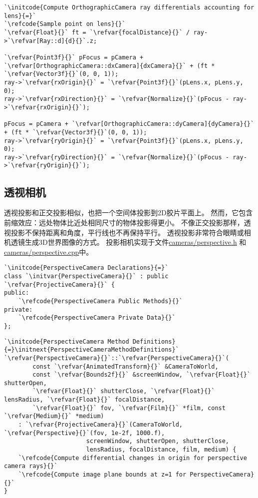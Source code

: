 \begin{lstlisting}
`\initcode{Compute OrthographicCamera ray differentials accounting for lens}{=}`
`\refcode{Sample point on lens}{}`
`\refvar{Float}{}` ft = `\refvar{focalDistance}{}` / ray->`\refvar[Ray::d]{d}{}`.z;

`\refvar{Point3f}{}` pFocus = pCamera + `\refvar[OrthographicCamera::dxCamera]{dxCamera}{}` + (ft * `\refvar{Vector3f}{}`(0, 0, 1));
ray->`\refvar{rxOrigin}{}` = `\refvar{Point3f}{}`(pLens.x, pLens.y, 0);
ray->`\refvar{rxDirection}{}` = `\refvar{Normalize}{}`(pFocus - ray->`\refvar{rxOrigin}{}`);

pFocus = pCamera + `\refvar[OrthographicCamera::dyCamera]{dyCamera}{}` + (ft * `\refvar{Vector3f}{}`(0, 0, 1));
ray->`\refvar{ryOrigin}{}` = `\refvar{Point3f}{}`(pLens.x, pLens.y, 0);
ray->`\refvar{ryDirection}{}` = `\refvar{Normalize}{}`(pFocus - ray->`\refvar{ryOrigin}{}`);
\end{lstlisting}

\subsection{透视相机}\label{sub:透视相机}
透视投影和正交投影相似，也把一个空间体投影到2D胶片平面上。
然而，它包含前缩效应：远处物体比近处相同尺寸的物体投影得更小。
不像正交投影那样，透视投影不保持距离和角度，平行线也不再保持平行。
透视投影非常符合眼睛或相机透镜生成3D世界图像的方式。
投影相机实现于文件\href{https://github.com/mmp/pbrt-v3/blob/master/src/cameras/perspective.h}{\ttfamily cameras/perspective.h}
和\href{https://github.com/mmp/pbrt-v3/blob/master/src/cameras/perspective.cpp}{\ttfamily cameras/perspective.cpp}中。
\begin{lstlisting}
`\initcode{PerspectiveCamera Declarations}{=}`
class `\initvar{PerspectiveCamera}{}` : public `\refvar{ProjectiveCamera}{}` {
public:
    `\refcode{PerspectiveCamera Public Methods}{}`
private:
    `\refcode{PerspectiveCamera Private Data}{}`
};
\end{lstlisting}
\begin{lstlisting}
`\initcode{PerspectiveCamera Method Definitions}{=}\initnext{PerspectiveCameraMethodDefinitions}`
`\refvar{PerspectiveCamera}{}`::`\refvar{PerspectiveCamera}{}`(
        const `\refvar{AnimatedTransform}{}` &CameraToWorld,
        const `\refvar{Bounds2f}{}` &screenWindow, `\refvar{Float}{}` shutterOpen,
        `\refvar{Float}{}` shutterClose, `\refvar{Float}{}` lensRadius, `\refvar{Float}{}` focalDistance,
        `\refvar{Float}{}` fov, `\refvar{Film}{}` *film, const `\refvar{Medium}{}` *medium)
    : `\refvar{ProjectiveCamera}{}`(CameraToWorld, `\refvar{Perspective}{}`(fov, 1e-2f, 1000.f),
                       screenWindow, shutterOpen, shutterClose,
                       lensRadius, focalDistance, film, medium) {
    `\refcode{Compute differential changes in origin for perspective camera rays}{}`
    `\refcode{Compute image plane bounds at z=1 for PerspectiveCamera}{}`
}
\end{lstlisting}

